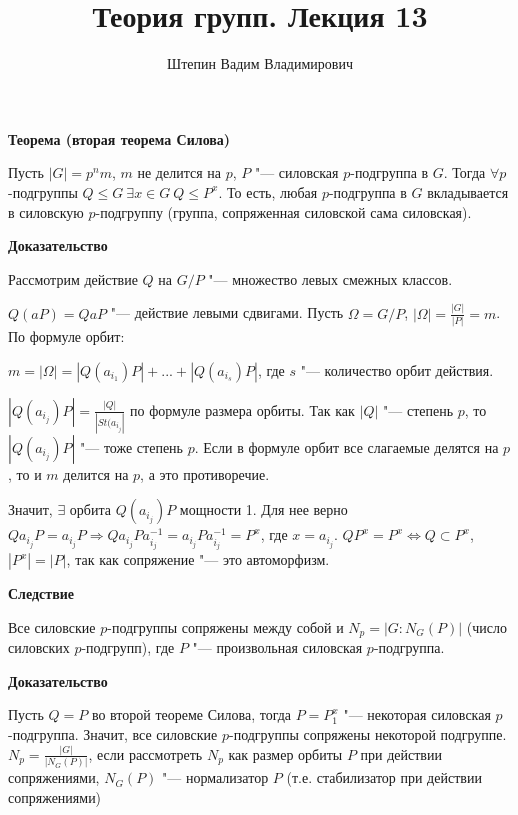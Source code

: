 \documentclass{article}
\title{Теория групп. Лекция 13}
\author{Штепин Вадим Владимирович}
\date{\DTMdate{2019-11-28}}
\begin{document}
\maketitle

\textbf{Теорема (вторая теорема Силова)}

Пусть $|G| = p^nm$, $m$ не делится на $p$, $P$ "--- силовская $p$-подгруппа в $G$. Тогда $\forall p$-подгруппы $Q \leq G \  \exists x \in G \  Q \leq P^x$. То есть, любая $p$-подгруппа в $G$ вкладывается в силовскую $p$-подгруппу (группа, сопряженная силовской сама силовская).

\vspace{5pt}

\textbf{Доказательство}

Рассмотрим действие $Q$ на $G/P$ "--- множество левых смежных классов. 

$Q(aP) = QaP$ "--- действие левыми сдвигами. Пусть $\Omega = G/P$, $|\Omega| = \frac{|G|}{|P|} = m$. По формуле орбит:

$m = |\Omega| = |Q(a_{i_1})P| + ... + |Q(a_{i_s})P|$, где $s$ "--- количество орбит действия.

$|Q(a_{i_j})P| = \frac{|Q|}{|St(a_{i_j}|}$ по формуле размера орбиты. Так как $|Q|$ "--- степень $p$, то $|Q(a_{i_j})P|$ "--- тоже степень $p$. Если в формуле орбит все слагаемые делятся на $p$, то и $m$ делится на $p$, а это противоречие.

Значит, $\exists$ орбита $Q(a_{i_j})P$ мощности 1. Для нее верно $Qa_{i_j}P = a_{i_j}P \Rightarrow Qa_{i_j}Pa_{i_j}^{-1} = a_{i_j}Pa_{i_j}^{-1} = P^x$, где $x = a_{i_j}$. $QP^x = P^x \Leftrightarrow Q \subset P^x$, $|P^x| = |P|$, так как сопряжение "--- это автоморфизм.

\vspace{10pt}

\textbf{Следствие}

Все силовские $p$-подгруппы сопряжены между собой и $N_p = |G:N_G(P)|$ (число силовских $p$-подгрупп), где $P$ "--- произвольная силовская $p$-подгруппа.

\vspace{5pt}

\textbf{Доказательство}

Пусть $Q = P$ во второй теореме Силова, тогда $P = P_1^x$ "--- некоторая силовская $p$-подгруппа. Значит, все силовские $p$-подгруппы сопряжены некоторой подгруппе. $N_p = \frac{|G|}{|N_G(P)|}$, если рассмотреть $N_p$ как размер орбиты $P$ при действии сопряжениями, $N_G(P)$ "--- нормализатор $P$ (т.е. стабилизатор при действии сопряжениями)
\end{document}
